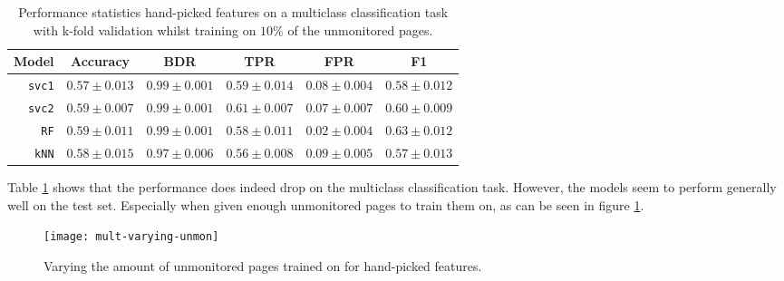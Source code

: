 \begin{table}[ht]
  \centering
  \begin{tabular}{ r  r  r  r  r  r } \hline
    \multicolumn{1}{c}{\textbf{Model}} & \multicolumn{1}{c}{\textbf{Accuracy}} & \multicolumn{1}{c}{\textbf{BDR}} & \multicolumn{1}{c}{\textbf{TPR}} &
      \multicolumn{1}{c}{\textbf{FPR}} & \multicolumn{1}{c}{\textbf{F1}} \\ \hline

    \texttt{svc1} & $0.57 \pm 0.013$ & $0.99 \pm 0.001$ & $0.59 \pm 0.014$ & $0.08 \pm 0.004$ & $0.58 \pm 0.012$ \\

    \texttt{svc2} & $0.59 \pm 0.007$ & $0.99 \pm 0.001$ & $0.61 \pm 0.007$ & $0.07 \pm 0.007$ & $0.60 \pm 0.009$ \\

    \texttt{RF} & $0.59 \pm 0.011$ & $0.99 \pm 0.001$ & $0.58 \pm 0.011$ & $0.02 \pm 0.004$ & $0.63 \pm 0.012$\\

    \texttt{kNN} & $0.58 \pm 0.015$ & $0.97 \pm 0.006$ & $0.56 \pm 0.008$ & $0.09 \pm 0.005$ & $0.57 \pm 0.013$ \\

    \hline
  \end{tabular}
  \caption{Performance statistics hand-picked features on a multiclass classification task with k-fold validation whilst training on $10\%$ of the unmonitored pages.}
  \label{table:mult-handpicked-test-error}
\end{table}

Table \ref{table:mult-handpicked-test-error} shows that the performance does indeed drop on the multiclass classification task.
However, the models seem to perform generally well on the test set.
Especially when given enough unmonitored pages to train them on, as can be seen in figure \ref{fig:mult-varying-unmon}.

\begin{figure}[ht]
  \centering
  \texttt{[image: mult-varying-unmon]}
  \caption{Varying the amount of unmonitored pages trained on for hand-picked features.}
  \label{fig:mult-varying-unmon}
\end{figure}

